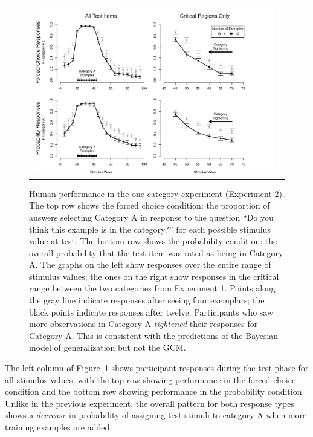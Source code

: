 \documentclass[doc,apacite]{apa6}
\begin{document}
\begin{figure}[t]
\begin{center}
\begin{tabular}{cc}
\includegraphics[width=5in]{figures/one_cat_results.pdf}
\end{tabular}
\end{center}
\caption{{\small  Human performance in the one-category experiment (Experiment 2). The top row shows the {\sc forced choice} condition: the proportion of answers selecting Category A in response to the question ``Do you think this example is in the category?'' for each possible stimulus value at test. The bottom row shows the {\sc probability} condition: the overall probability that the test item was rated as being in Category A. The graphs on the left show responses over the entire range of stimulus values; the ones on the right show responses in the critical range between the two categories from Experiment 1. Points along the gray line indicate responses after seeing {\sc four} exemplars; the black points indicate responses after {\sc twelve}. Participants who saw more observations in Category A {\it tightened} their responses for Category A. This is consistent with the predictions of the Bayesian model of generalization but not the GCM.}}
\label{fig:exp2results}
\end{figure}

The left column of Figure~\ref{fig:exp2results} shows participant responses during the test phase for all stimulus values, with the top row showing performance in the {\sc forced choice} condition and the bottom row showing performance in the {\sc probability} condition. Unlike in the previous experiment, the overall pattern for both response types shows a {\it decrease} in probability of assigning test stimuli to category A when more training examples are added.
\end{document}
